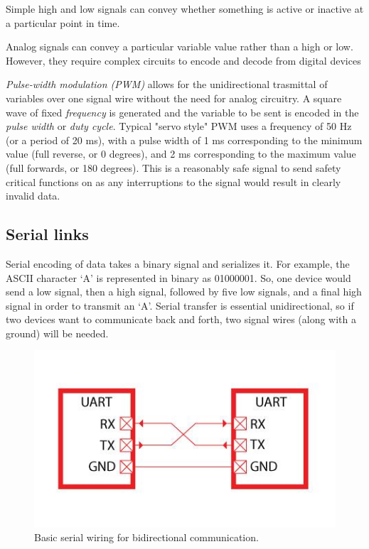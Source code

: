 \begin{asparaenum}[a)]
\item Simple high and low signals can convey whether something is active or inactive at a particular point in time.
\item Analog signals can convey a particular variable value rather than a high or low. However, they require complex circuits to encode and decode from digital devices
\item \textit{Pulse-width modulation (PWM)} allows for the unidirectional trasmittal of variables over one signal wire without the need for analog circuitry. A square wave of fixed \textit{frequency} is generated and the variable to be sent is encoded in the \textit{pulse width} or \textit{duty cycle}. Typical "servo style" PWM uses a frequency of 50 Hz (or a period of 20 ms), with a pulse width of 1 ms corresponding to the minimum value (full reverse, or 0 degrees), and 2 ms corresponding to the maximum value (full forwards, or 180 degrees). This is a reasonably safe signal to send safety critical functions on as any interruptions to the signal would result in clearly invalid data.
\end{asparaenum}

\subsection{Serial links} %

Serial encoding of data takes a binary signal and serializes it. For example, the ASCII character `A' is represented in binary as 01000001. So, one device would send a low signal, then a high signal, followed by five low signals, and a final high signal in order to transmit an `A'. Serial transfer is essential unidirectional, so if two devices want to communicate back and forth, two signal wires (along with a ground) will be needed.

\begin{figure}[H]
  \includegraphics{imgs/setup_uart.jpeg}
  \caption{Basic serial wiring for bidirectional communication.}
\end{figure}

